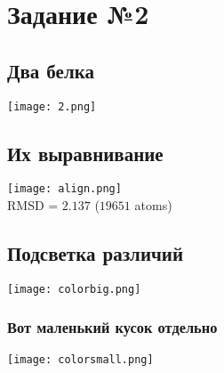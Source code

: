 \documentclass{article}
\begin{document}
  \section{Задание №2}
  \subsection{Два белка}
  \texttt{[image: 2.png]}

  \subsection{Их выравнивание}
  \begin{center}
    \texttt{[image: align.png]} \\
    RMSD = $2.137$ ($19651$ atoms)
  \end{center}

  \subsection{Подсветка различий}
  \texttt{[image: colorbig.png]}
  \subsubsection{Вот маленький кусок отдельно}
  \begin{center}
    \texttt{[image: colorsmall.png]}
  \end{center}
\end{document}
